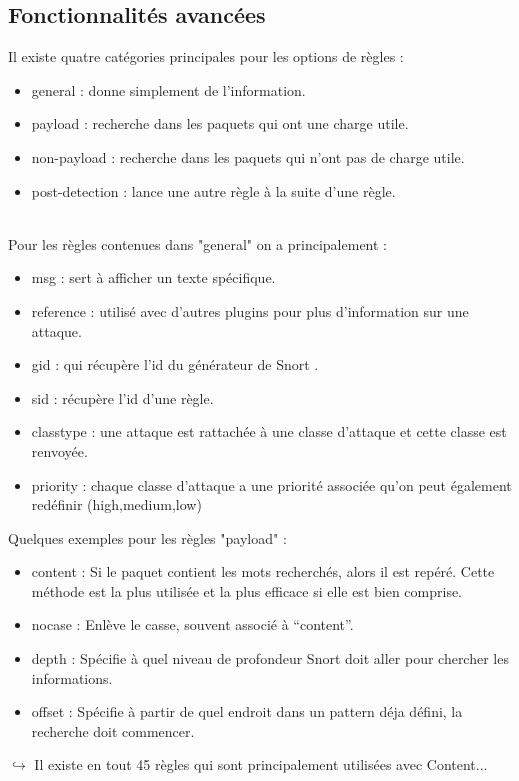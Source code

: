 \documentclass[a4paper,11pt,french]{article}
\begin{document}
\subsection{Fonctionnalités avancées}
Il existe quatre catégories principales pour les options de règles :
\begin{itemize}
\item general : donne simplement de l’information.
\item payload : recherche dans les paquets qui ont une charge utile.
\item non-payload : recherche dans les paquets qui n’ont pas de charge utile.
\item post-detection : lance une autre règle à la suite d’une règle.
\end{itemize}
~~\\
Pour les règles contenues dans "general" on a principalement :
\begin{itemize}
\item msg : sert à afficher un texte spécifique.
\item reference : utilisé avec d’autres plugins pour plus d’information sur une attaque.
\item gid : qui récupère l’id du générateur de Snort .
\item sid : récupère l’id d’une règle.
\item classtype : une attaque est rattachée à une classe d’attaque et cette classe est renvoyée.
\item priority : chaque classe d’attaque a une priorité associée qu’on peut également redéfinir (high,medium,low)
\end{itemize}

Quelques exemples pour les règles "payload" : 
\begin{itemize}
\item content : Si le paquet contient les mots recherchés, alors il est repéré. Cette méthode est la plus utilisée et la plus efficace si elle est bien comprise.
\item nocase : Enlève le casse, souvent associé à “content”.
\item depth : Spécifie à quel niveau de profondeur Snort doit aller pour chercher les informations.
\item offset : Spécifie à partir de quel endroit dans un pattern déja défini, la recherche doit commencer.
\end{itemize}


$\hookrightarrow$ Il existe en tout 45 règles qui sont principalement utilisées avec Content...\\
\end{document}
